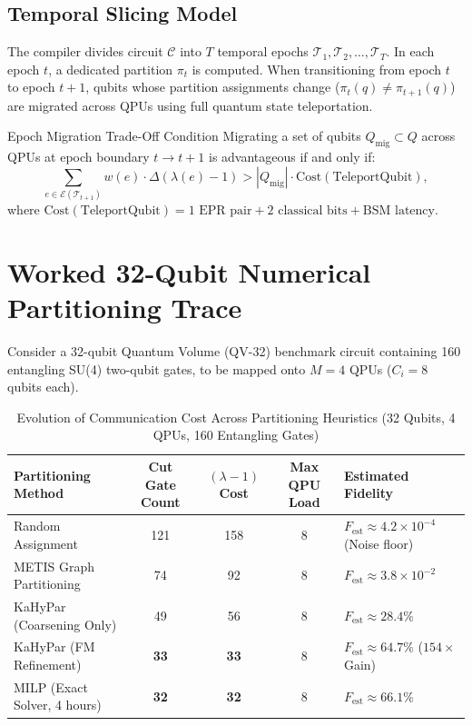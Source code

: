 \subsection{Temporal Slicing Model}
The compiler divides circuit $\mathcal{C}$ into $T$ temporal epochs $\mathcal{T}_1, \mathcal{T}_2, \dots, \mathcal{T}_T$. In each epoch $t$, a dedicated partition $\pi_t$ is computed. When transitioning from epoch $t$ to epoch $t+1$, qubits whose partition assignments change ($\pi_t(q) \neq \pi_{t+1}(q)$) are migrated across QPUs using full quantum state teleportation.

\begin{theorembox}{Epoch Migration Trade-Off Condition}
Migrating a set of qubits $Q_{\text{mig}} \subset Q$ across QPUs at epoch boundary $t \to t+1$ is advantageous if and only if:
\begin{equation}
    \sum_{e \in \mathcal{E}(\mathcal{T}_{t+1})} w(e) \cdot \Delta (\lambda(e) - 1) > |Q_{\text{mig}}| \cdot \text{Cost}(\text{TeleportQubit}),
    \label{eq:epoch_migration_tradeoff}
\end{equation}
where $\text{Cost}(\text{TeleportQubit}) = 1\text{ EPR pair} + 2\text{ classical bits} + \text{BSM latency}$.
\end{theorembox}


\section{Worked 32-Qubit Numerical Partitioning Trace}
\label{sec:worked_partitioning_trace}

Consider a 32-qubit Quantum Volume (QV-32) benchmark circuit containing 160 entangling SU(4) two-qubit gates, to be mapped onto $M = 4$ QPUs ($C_i = 8$ qubits each).

\begin{table}[htbp]
\centering
\caption{Evolution of Communication Cost Across Partitioning Heuristics (32 Qubits, 4 QPUs, 160 Entangling Gates)}
\label{tab:partitioning_trace_comparison}
\begin{tabular}{l c c c l}
\toprule
\textbf{Partitioning Method} & \textbf{Cut Gate Count} & \textbf{$(\lambda - 1)$ Cost} & \textbf{Max QPU Load} & \textbf{Estimated Fidelity} \\
\midrule
Random Assignment & 121 & 158 & 8 & $F_{\text{est}} \approx 4.2 \times 10^{-4}$ (Noise floor) \\
METIS Graph Partitioning & 74 & 92 & 8 & $F_{\text{est}} \approx 3.8 \times 10^{-2}$ \\
KaHyPar (Coarsening Only) & 49 & 56 & 8 & $F_{\text{est}} \approx 28.4\%$ \\
KaHyPar (FM Refinement) & \textbf{33} & \textbf{33} & 8 & \textbf{$F_{\text{est}} \approx 64.7\%$} ($154\times$ Gain) \\
MILP (Exact Solver, 4 hours) & \textbf{32} & \textbf{32} & 8 & $F_{\text{est}} \approx 66.1\%$ \\
\bottomrule
\end{tabular}
\end{table}

